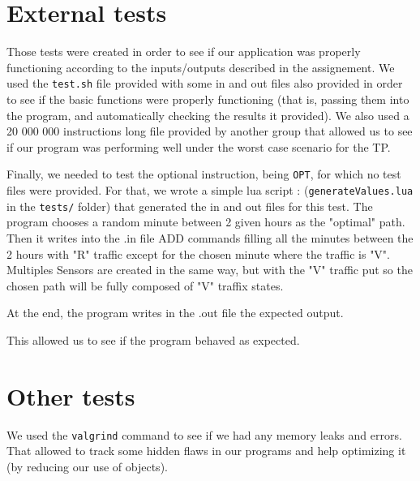 \documentclass[10pt]{article}
\begin{document}
\section{External tests}
Those tests were created in order to see if our application was properly functioning according to the inputs/outputs described in the assignement. We used the \texttt{test.sh} file provided with some in and out files also provided in order to see if the basic functions were properly functioning (that is, passing them into the program, and automatically checking the results it provided). We also used a 20 000 000 instructions long file provided by another group that allowed us to see if our program was performing well under the worst case scenario for the TP.

Finally, we needed to test the optional instruction, being \texttt{OPT}, for which no test files were provided. For that, we wrote a simple lua script : (\texttt{generateValues.lua} in the \texttt{tests/} folder) that generated the in and out files for this test. The program chooses a random minute between 2 given hours as the "optimal" path. Then it writes into the .in file ADD commands filling all the minutes between the 2 hours with "R" traffic except for the chosen minute where the traffic is "V". Multiples Sensors are created in the same way, but with the "V" traffic put so the chosen path will be fully composed of "V" traffix states.

At the end, the program writes in the .out file the expected output.

This allowed us to see if the program behaved as expected.

\section{Other tests}
We used the {\tt valgrind} command to see if we had any memory leaks and errors. That allowed to track some hidden flaws in our programs and help optimizing it (by reducing our use of objects).
\end{document}
